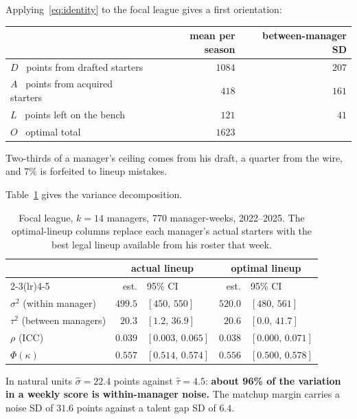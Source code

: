 \documentclass[11pt]{article}
\begin{document}
Applying~\eqref{eq:identity} to the focal league gives a first orientation:

\begin{center}\small
\begin{tabular}{lrr}
\toprule
& mean per season & between-manager SD \\
\midrule
$D$ \ points from drafted starters  & $1084$ & $207$ \\
$A$ \ points from acquired starters & $418$  & $161$ \\
$L$ \ points left on the bench      & $121$  & $41$ \\
\midrule
$O$ \ optimal total                 & $1623$ & \\
\bottomrule
\end{tabular}
\end{center}

Two-thirds of a manager's ceiling comes from his draft, a quarter from the wire,
and $7\%$ is forfeited to lineup mistakes.

Table~\ref{tab:budget} gives the variance decomposition.

\begin{table}[h]
\centering\small
\begin{tabular}{lrlrl}
\toprule
& \multicolumn{2}{c}{actual lineup} & \multicolumn{2}{c}{optimal lineup} \\
\cmidrule(lr){2-3}\cmidrule(lr){4-5}
& est. & 95\% CI & est. & 95\% CI \\
\midrule
$\sigma^2$ (within manager) & $499.5$ & $[450,\,550]$ & $520.0$ & $[480,\,561]$ \\
$\tau^2$ (between managers) & $20.3$ & $[1.2,\,36.9]$ & $20.6$ & $[0.0,\,41.7]$ \\
$\rho$ (ICC)                & $0.039$ & $[0.003,\,0.065]$ & $0.038$ & $[0.000,\,0.071]$ \\
$\Phi(\kappa)$              & $0.557$ & $[0.514,\,0.574]$ & $0.556$ & $[0.500,\,0.578]$ \\
\bottomrule
\end{tabular}
\caption{Focal league, $k=14$ managers, 770 manager-weeks, 2022--2025. The
optimal-lineup columns replace each manager's actual starters with the best
legal lineup available from his roster that week.}
\label{tab:budget}
\end{table}

In natural units $\widehat\sigma = 22.4$ points against $\widehat\tau = 4.5$:
\textbf{about 96\% of the variation in a weekly score is within-manager noise.}
The matchup margin carries a noise SD of $31.6$ points against a talent gap SD
of $6.4$.
\end{document}
